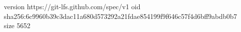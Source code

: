 version https://git-lfs.github.com/spec/v1
oid sha256:6c9960b39c3dac11a680d573292a21fdae854199f9f646c57f4d6bff9abdb0b7
size 5652
